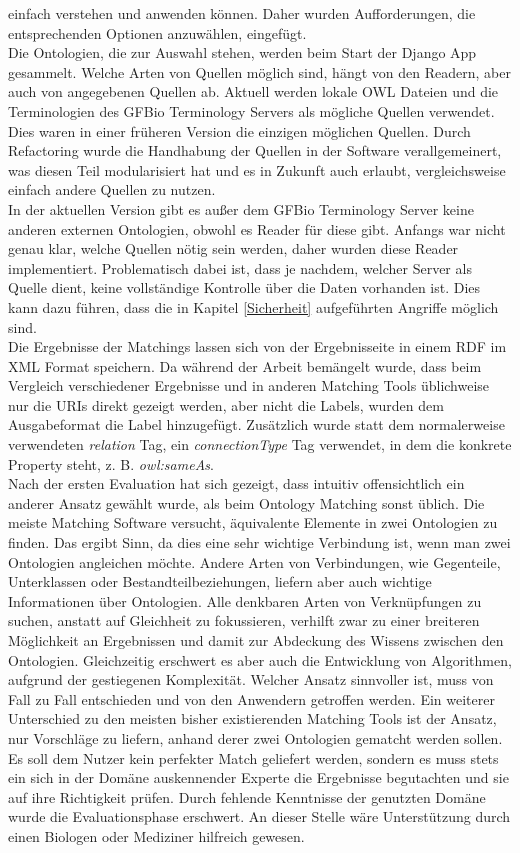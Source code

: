 einfach verstehen und anwenden können. Daher wurden Aufforderungen, die
entsprechenden Optionen anzuwählen, eingefügt.\\
Die Ontologien, die zur Auswahl stehen, werden beim Start der Django App
gesammelt. Welche Arten von Quellen möglich sind, hängt von den Readern, aber
auch von angegebenen Quellen ab. Aktuell werden lokale OWL Dateien und die
Terminologien des GFBio Terminology Servers als mögliche Quellen verwendet. Dies
waren in einer früheren Version die einzigen möglichen Quellen. Durch
Refactoring wurde die Handhabung der Quellen in der Software verallgemeinert,
was diesen Teil modularisiert hat und es in Zukunft auch erlaubt, vergleichsweise einfach andere
Quellen zu nutzen.\\
In der aktuellen Version gibt es außer dem GFBio Terminology Server keine
anderen externen Ontologien, obwohl es Reader für diese gibt. Anfangs war
nicht genau klar, welche Quellen nötig sein werden, daher wurden diese Reader
implementiert. Problematisch dabei ist, dass je nachdem, welcher Server als
Quelle dient, keine vollständige Kontrolle über die Daten vorhanden ist. Dies
kann dazu führen, dass die in Kapitel \ref{Sicherheit} aufgeführten Angriffe
möglich sind.\\
Die Ergebnisse der Matchings lassen sich von der Ergebnisseite in einem RDF
im XML Format speichern. Da während der Arbeit bemängelt wurde, dass beim
Vergleich verschiedener Ergebnisse und in anderen Matching Tools üblichweise nur
die URIs direkt gezeigt werden, aber nicht die Labels, wurden dem Ausgabeformat
die Label hinzugefügt. Zusätzlich wurde statt dem normalerweise verwendeten
\textit{relation} Tag, ein \textit{connectionType} Tag verwendet, in dem die
konkrete Property steht, z. B. \textit{owl:sameAs}.\\
Nach der ersten Evaluation hat sich gezeigt, dass intuitiv offensichtlich ein
anderer Ansatz gewählt wurde, als beim Ontology Matching sonst üblich. Die
meiste Matching Software versucht, äquivalente Elemente in zwei Ontologien zu
finden. Das ergibt Sinn, da dies eine sehr wichtige Verbindung ist, wenn man
zwei Ontologien angleichen möchte. Andere Arten von Verbindungen, wie
Gegenteile, Unterklassen oder Bestandteilbeziehungen, liefern aber auch wichtige
Informationen über Ontologien. Alle denkbaren Arten von Verknüpfungen zu suchen,
anstatt auf Gleichheit zu fokussieren, verhilft zwar zu einer
breiteren Möglichkeit an Ergebnissen und damit zur Abdeckung des Wissens
zwischen den Ontologien. Gleichzeitig erschwert es aber auch die Entwicklung von
Algorithmen, aufgrund der gestiegenen Komplexität. Welcher Ansatz sinnvoller
ist, muss von Fall zu Fall entschieden und von den Anwendern getroffen
werden. Ein weiterer Unterschied zu den meisten bisher existierenden Matching Tools ist der Ansatz, nur Vorschläge zu liefern, anhand derer zwei
Ontologien gematcht werden sollen. Es soll dem Nutzer kein perfekter Match
geliefert werden, sondern es muss stets ein sich in der Domäne auskennender
Experte die Ergebnisse begutachten und sie auf ihre Richtigkeit prüfen. Durch
fehlende Kenntnisse der genutzten Domäne wurde die Evaluationsphase erschwert.
An dieser Stelle wäre Unterstützung durch einen Biologen oder Mediziner
hilfreich gewesen.

